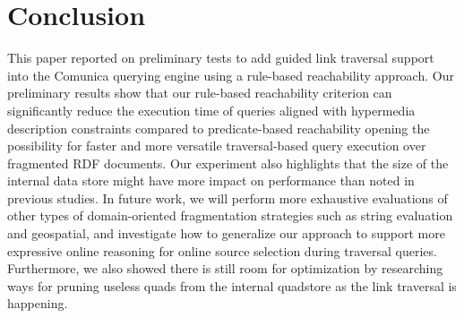 \section{Conclusion}

This paper reported on preliminary tests to add guided link traversal support into the Comunica querying engine using a rule-based reachability approach.
Our preliminary results show that our rule-based reachability criterion can significantly reduce the execution time of queries aligned with hypermedia description constraints compared to predicate-based reachability
opening the possibility for faster and more versatile traversal-based query execution over fragmented RDF documents.
Our experiment also highlights that the size of the internal data store might have more impact on performance than noted in previous studies.
In future work, we will perform more exhaustive evaluations of other types of domain-oriented fragmentation strategies such as string evaluation and geospatial,
and investigate how to generalize our approach to support more expressive online reasoning for online source selection during traversal queries.
Furthermore, we also showed there is still room for optimization by researching ways for pruning useless quads from the internal quadstore as the link traversal is happening.
